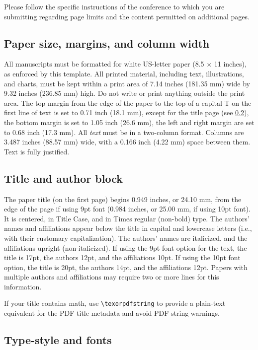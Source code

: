 \documentclass[9pt]{ieeeconf}
\begin{document}
Please follow the specific instructions of the conference to which you are submitting regarding page limits and the content permitted on additional pages.


\subsection{Paper size, margins, and column width}
\label{sec:sizes}

All manuscripts must be formatted for white US-letter paper (8.5 $\times$ 11 inches), as enforced by this template. All printed material, including text, illustrations, and charts, must be kept within a print area of 7.14 inches (181.35 mm) wide by 9.32 inches (236.85 mm) high. Do not write or print anything outside the print area. The top margin from the edge of the paper to the top of a capital T on the first line of text is set to 0.71 inch (18.1 mm), except for the title page (see \cref{sec:titleauthor}), the bottom margin is set to 1.05 inch (26.6 mm), the left and right margin are set to 0.68 inch (17.3 mm). All {\it text} must be in a two-column format. Columns are 3.487 inches (88.57 mm) wide, with a 0.166 inch (4.22 mm) space between them. Text is fully justified.

\subsection{Title and author block}
\label{sec:titleauthor}

The paper title (on the first page) begins 0.949 inches, or 24.10 mm, from the edge of the page if using 9pt font (0.984 inches, or 25.00 mm, if using 10pt font). It is centered, in Title Case, and in Times regular (non-bold) type. The authors' names and affiliations appear below the title in capital and lowercase letters (i.e., with their customary capitalization). The authors' names are italicized, and the affiliations upright (non-italicized). If using the 9pt font option for the text, the title is 17pt, the authors 12pt, and the affiliations 10pt. If using the 10pt font option, the title is 20pt, the authors 14pt, and the affiliations 12pt.
Papers with multiple authors and affiliations may require two or more lines for this information.

If your title contains math, use \verb|\texorpdfstring| to provide a plain-text equivalent for the PDF title metadata and avoid PDF-string warnings.

\subsection{Type-style and fonts}
\label{sec:typestyle}
\end{document}
